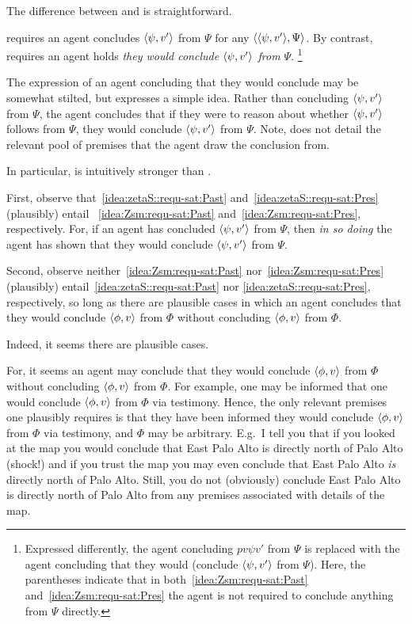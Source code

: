 \begin{note}
  The difference between \izetaS{} and \izetaSm{} is straightforward.

  \izetaS{} requires an agent concludes \(\langle \psi, v' \rangle\) from \(\Psi\) for any \requ{} \(\langle \langle \psi, v' \rangle, \Psi \rangle\).
  By contrast, \izetaSm{} requires an agent holds \emph{they would conclude \(\langle \psi, v' \rangle\) from \(\Psi\)}.%
  \footnote{
    Expressed differently, the agent concluding \(pv{\psi}{v'}\) from \(\Psi\) is replaced with the agent concluding that they would (conclude \(\langle \psi, v' \rangle\) from \(\Psi\)).
    Here, the parentheses indicate that in both~\ref{idea:Zsm:requ-sat:Past} and~\ref{idea:Zsm:requ-sat:Pres} the agent is not required to conclude anything from \(\Psi\) directly.
  }

  The expression of an agent concluding that they would conclude may be somewhat stilted, but expresses a simple idea.
  Rather than concluding \(\langle \psi, v' \rangle\) from \(\Psi\), the agent concludes that if they were to reason about whether \(\langle \psi, v' \rangle\) follows from \(\Psi\), they would conclude \(\langle \psi, v' \rangle\) from \(\Psi\).
  Note, \izetaSm{} does not detail the relevant pool of premises that the agent draw the conclusion from.
\end{note}

\begin{note}
  In particular, \izetaS{} is intuitively stronger than \izetaSm{}.

  First, observe that~\ref{idea:zetaS::requ-sat:Past} and~\ref{idea:zetaS::requ-sat:Pres} (plausibly) entail ~\ref{idea:Zsm:requ-sat:Past} and~\ref{idea:Zsm:requ-sat:Pres}, respectively.
  For, if an agent has concluded \(\langle \psi, v' \rangle\) from \(\Psi\), then \emph{in so doing} the agent has shown that they would conclude \(\langle \psi, v' \rangle\) from \(\Psi\).

  Second, observe neither~\ref{idea:Zsm:requ-sat:Past} nor~\ref{idea:Zsm:requ-sat:Pres} (plausibly) entail~\ref{idea:zetaS::requ-sat:Past} nor \ref{idea:zetaS::requ-sat:Pres}, respectively, so long as there are plausible cases in which an agent concludes that they would conclude \(\langle \phi, v \rangle\) from \(\Phi\) without concluding \(\langle \phi, v \rangle\) from \(\Phi\).

  Indeed, it seems there are plausible cases.

  For, it seems an agent may conclude that they would conclude \(\langle \phi, v \rangle\) from \(\Phi\) without concluding \(\langle \phi, v \rangle\) from \(\Phi\).
  For example, one may be informed that one would conclude \(\langle \phi, v \rangle\) from \(\Phi\) via testimony.
  Hence, the only relevant premises one plausibly requires is that they have been informed they would conclude \(\langle \phi, v \rangle\) from \(\Phi\) via testimony, and \(\Phi\) may be arbitrary.
  E.g.\ I tell you that if you looked at the map you would conclude that East Palo Alto is directly north of Palo Alto (shock!) and if you trust the map you may even conclude that East Palo Alto \emph{is} directly north of Palo Alto.
  Still, you do not (obviously) conclude East Palo Alto is directly north of Palo Alto from any premises associated with details of the map.
\end{note}

